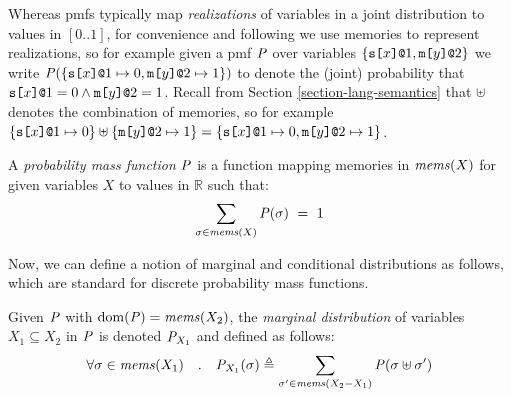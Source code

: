 Whereas pmfs typically map \emph{realizations} of variables in a joint
distribution to values in $[0..1]$, for convenience and following
\cite{barthe2019probabilistic,skalka-near-ppdp24} we use memories to
represent realizations, so for example given a pmf $\mathit{P}$ over
variables $\{ \texttt{s[}x\texttt{]}\texttt{@}1, \texttt{m[}y\texttt{]}\texttt{@}2 \}$ we write $\mathit{P}(\{
\texttt{s[}x\texttt{]}\texttt{@}1 \mapsto 0, \texttt{m[}y\texttt{]}\texttt{@}2 \mapsto 1 \})$ to
denote the (joint) probability that $\texttt{s[}x\texttt{]}\texttt{@}1 = 0 \wedge
\texttt{m[}y\texttt{]}\texttt{@}2 = 1$. Recall from Section
\ref{section-lang-semantics} that $\uplus$ denotes the combination of
memories, so for example $\{ \texttt{s[}x\texttt{]}\texttt{@}1 \mapsto 0\} \uplus
\{\texttt{m[}y\texttt{]}\texttt{@}2 \mapsto 1 \} = \{ \texttt{s[}x\texttt{]}\texttt{@}1 \mapsto 0,
\texttt{m[}y\texttt{]}\texttt{@}2 \mapsto 1 \}$.
\begin{definition}
  A \emph{probability mass function} $\mathit{P}$ is a function
  mapping memories in $\mathit{mems}(X)$ for given variables $X$ to
  values in $\mathbb{R}$ such that:
  $$
  \sum_{\sigma \in \mathit{mems}(X)} \mathit{P}(\sigma) \  = \ 1
  $$
\end{definition}
Now, we can define a notion of marginal and conditional
distributions as follows, which are standard for discrete
probability mass functions. 
\begin{definition}
  Given $\mathit{P}$ with $\mathrm{dom}(\mathit{P}) = \mathit{mems}(X_2)$, the \emph{marginal distribution}
  of variables $X_1 \subseteq X_2$ in $\mathit{P}$ is denoted ${\mathit{P}}_{X_1}$ and defined as follows:
  $$
  \forall \sigma \in \mathit{mems}(X_1) \quad . \quad {\mathit{P}}_{X_1}(\sigma) \triangleq
  \sum_{\sigma' \in \mathit{mems}(X_2-X_1)} \mathit{P}(\sigma \uplus \sigma')
  $$
\end{definition}

